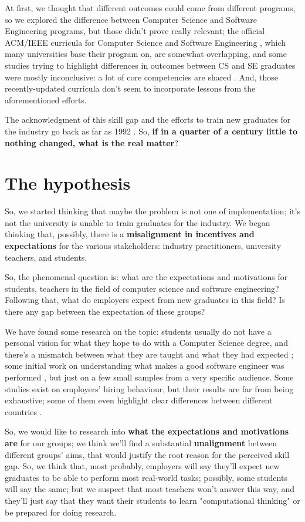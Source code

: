 \documentclass{sigchi}
\begin{document}
At first, we thought that different outcomes could come from different programs, so we explored the difference between Computer Science and Software Engineering programs, but those didn't prove really relevant; the official ACM/IEEE curricula for Computer Science \cite{Force2013} and Software Engineering \cite{Ardis2015}, which many universities base their program on, are somewhat overlapping, and some studies trying to highlight differences in outcomes between CS and SE graduates were mostly inconclusive: a lot of core competencies are shared \cite{Meziane2004} \cite{Rasool2014}. And, those recently-updated curricula don't seem to incorporate lessons from the aforementioned efforts.

The acknowledgment of this skill gap and the efforts to train new graduates for the industry go back as far as 1992 \cite{Dawson1992}. So, \textbf{if in a quarter of a century little to nothing changed, what is the real matter}?

\section{The hypothesis}
So, we started thinking that maybe the problem is not one of implementation; it's not the university is unable to train graduates for the industry. We began thinking that, possibly, there is a \textbf{misalignment in incentives and expectations} for the various stakeholders: industry practitioners, university teachers, and students.

 So, the phenomenal question is: what are the expectations and motivations for students, teachers in the field of computer science and software engineering? Following that, what do employers expect from new graduates in this field? Is there any gap between the expectation of these groups?
 
 We have found some research on the topic: students usually do not have a personal vision for what they hope to do with a Computer Science degree, and there's a mismatch between what they are taught and what they had expected \cite{Hewner2011}; some initial work on understanding what makes a good software engineer was performed \cite{Li2015}, but just on a few small samples from a very specific audience. Some studies exist on employers' hiring behaviour, but their results are far from being exhaustive; some of them even highlight clear differences between different countries \cite{Stasio2016}.
 
 So, we would like to research into \textbf{what the expectations and motivations are} for our groups; we think we'll find a substantial \textbf{unalignment} between different groups' aims, that would justify the root reason for the perceived skill gap. So, we think that, most probably, employers will say they'll expect new graduates to be able to perform most real-world tasks; possibly, some students will say the same; but we suspect that most teachers won't answer this way, and they'll just say that they want their students to learn "computational thinking" or be prepared for doing research.
 
\end{document}
